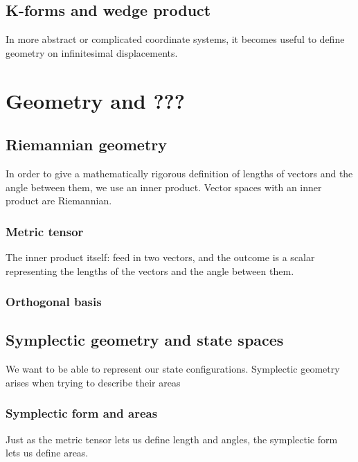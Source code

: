 \documentclass{book}
\begin{document}
\section{K-forms and wedge product}
In more abstract or complicated coordinate systems, it becomes useful to define geometry on infinitesimal displacements. 
\chapter{Geometry and ???}

\section{Riemannian geometry}
In order to give a mathematically rigorous definition of lengths of vectors and the angle between them, we use an inner product. Vector spaces with an inner product are Riemannian. 
\subsection{Metric tensor}
The inner product itself: feed in two vectors, and the outcome is a scalar representing the lengths of the vectors and the angle between them. 
\subsection{Orthogonal basis}

\section{Symplectic geometry and state spaces}
We want to be able to represent our state configurations. Symplectic geometry arises when trying to describe their areas

\subsection{Symplectic form and areas}
Just as the metric tensor lets us define length and angles, the symplectic form lets us define areas. 
\end{document}
